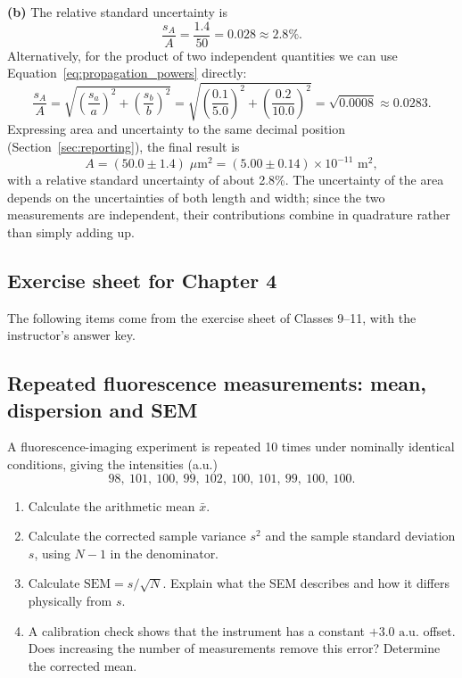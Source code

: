 \textbf{(b)} The relative standard uncertainty is
\begin{equation*}
\frac{s_A}{A} = \frac{1.4}{50} = 0.028 \approx 2.8\%.
\end{equation*}
Alternatively, for the product of two independent quantities we can use Equation~\eqref{eq:propagation_powers} directly:
\begin{equation*}
\frac{s_A}{A} = \sqrt{\left(\frac{s_a}{a}\right)^2 + \left(\frac{s_b}{b}\right)^2} = \sqrt{\left(\frac{0.1}{5.0}\right)^2 + \left(\frac{0.2}{10.0}\right)^2} = \sqrt{0.0008} \approx 0.0283.
\end{equation*}
Expressing area and uncertainty to the same decimal position (Section~\ref{sec:reporting}), the final result is
\begin{equation*}
A = (50.0 \pm 1.4)\;\mu\text{m}^2 = (5.00 \pm 0.14) \times 10^{-11}\text{ m}^2,
\end{equation*}
with a relative standard uncertainty of about 2.8\%. The uncertainty of the area depends on the uncertainties of both length and width; since the two measurements are independent, their contributions combine in quadrature rather than simply adding up.

\subsection*{Exercise sheet for Chapter 4}

The following items come from the exercise sheet of Classes 9--11, with the instructor's answer key.

\subsection{Repeated fluorescence measurements: mean, dispersion and SEM}
\label{ex:repeated_fluorescence}

A fluorescence-imaging experiment is repeated 10 times under nominally identical conditions, giving the intensities (a.u.)
\begin{equation*}
98,\ 101,\ 100,\ 99,\ 102,\ 100,\ 101,\ 99,\ 100,\ 100.
\end{equation*}
\begin{enumerate}[label=(\alph*)]
    \item Calculate the arithmetic mean $\bar{x}$.
    \item Calculate the corrected sample variance $s^2$ and the sample standard deviation $s$, using $N - 1$ in the denominator.
    \item Calculate $\text{SEM} = s/\sqrt{N}$. Explain what the SEM describes and how it differs physically from $s$.
    \item A calibration check shows that the instrument has a constant $+3.0\text{ a.u.}$ offset. Does increasing the number of measurements remove this error? Determine the corrected mean.
\end{enumerate}


